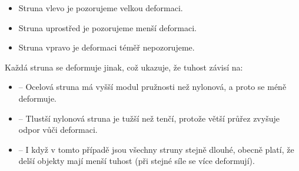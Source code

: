 \documentclass[letterpaper,10pt,english]{jupyterBook}
\begin{document}
\noindent{}
\begin{itemize}
\item {} 
\sphinxAtStartPar
Struna vlevo je  \sphinxhyphen{} pozorujeme velkou deformaci.

\item {} 
\sphinxAtStartPar
Struna uprostřed je  \sphinxhyphen{} pozorujeme menší deformaci.

\item {} 
\sphinxAtStartPar
Struna vpravo je  \sphinxhyphen{} deformaci téměř nepozorujeme.

\end{itemize}

\sphinxAtStartPar
Každá struna se deformuje jinak, což ukazuje, že tuhost závisí na:
\begin{itemize}
\item {} 
\sphinxAtStartPar
{} – Ocelová struna má vyšší modul pružnosti než nylonová, a proto se méně deformuje.

\item {} 
\sphinxAtStartPar
{} – Tlustší nylonová struna je tužší než tenčí, protože větší průřez zvyšuje odpor vůči deformaci.

\item {} 
\sphinxAtStartPar
{} – I když v tomto případě jsou všechny struny stejně dlouhé, obecně platí, že delší objekty mají menší tuhost (při stejné síle se více deformují).

\end{itemize}
\end{document}
